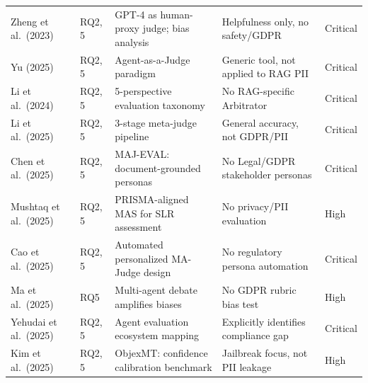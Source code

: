 \documentclass[12pt, a4paper]{article}
\begin{document}
\begin{small}
\begin{longtable}{L{3cm} C{1.2cm} L{3.5cm} L{3.5cm} C{1.5cm}}
Zheng et al.\ (2023) & RQ2, 5 & GPT-4 as human-proxy judge; bias analysis & Helpfulness only, no safety/GDPR & Critical \\
Yu (2025) & RQ2, 5 & Agent-as-a-Judge paradigm & Generic tool, not applied to RAG PII & Critical \\
Li et al.\ (2024) & RQ2, 5 & 5-perspective evaluation taxonomy & No RAG-specific Arbitrator & Critical \\
Li et al.\ (2025) & RQ2, 5 & 3-stage meta-judge pipeline & General accuracy, not GDPR/PII & Critical \\
Chen et al.\ (2025) & RQ2, 5 & MAJ-EVAL: document-grounded personas & No Legal/GDPR stakeholder personas & Critical \\
Mushtaq et al.\ (2025) & RQ2, 5 & PRISMA-aligned MAS for SLR assessment & No privacy/PII evaluation & High \\
Cao et al.\ (2025) & RQ2, 5 & Automated personalized MA-Judge design & No regulatory persona automation & Critical \\
Ma et al.\ (2025) & RQ5 & Multi-agent debate amplifies biases & No GDPR rubric bias test & High \\
Yehudai et al.\ (2025) & RQ2, 5 & Agent evaluation ecosystem mapping & Explicitly identifies compliance gap & Critical \\
Kim et al.\ (2025) & RQ2, 5 & ObjexMT: confidence calibration benchmark & Jailbreak focus, not PII leakage & High \\

\end{longtable}
\end{small}
\end{document}
